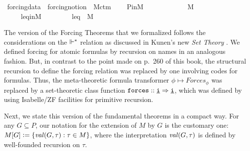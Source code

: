 \begin{isabelle}
\isamarkupfalse%
\ forcing{\isacharunderscore}{\kern0pt}data{}\ {\isacharequal}{\kern0pt}\ forcing{\isacharunderscore}{\kern0pt}notion\ {\isacharplus}{\kern0pt}\ M{\isacharunderscore}{\kern0pt}ctm{}\ {\isacharplus}{\kern0pt}\isanewline
\ \ \ P{\isacharunderscore}{\kern0pt}in{\isacharunderscore}{\kern0pt}M{\isacharcolon}{\kern0pt}\ \ \ \ \ \ \ \ \ \ \ {\isachardoublequoteopen}{\isasymbbbP}\ {\isasymin}\ M{\isachardoublequoteclose}\isanewline
\ \ \ \ \ leq{\isacharunderscore}{\kern0pt}in{\isacharunderscore}{\kern0pt}M{\isacharcolon}{\kern0pt}\ \ \ \ \ \ \ \ \ {\isachardoublequoteopen}leq\ {\isasymin}\ M{\isachardoublequoteclose}
\end{isabelle}
The version of the Forcing Theorems that we formalized follows the
considerations on the $\Vdash^*$ relation as discussed in Kunen's new
\emph{Set Theory}
\cite[p.~257ff]{kunen2011set}.
We defined forcing for atomic formulas by recursion on names in an
analogous fashion. But, in contrast to the point made on
p.~260 of this book, the structural recursion to define the forcing
relation was replaced by one  involving codes for formulas. Thus, the meta-theoretic formula
transformer $\phi\mapsto\mathit{Forces}_\phi$ was replaced by a
set-theoretic class function $\forceisa:: \tyi \fun \tyi$, which was defined by using
Isabelle/ZF facilities for primitive recursion.

Next, we state this version of the fundamental theorems in a compact
way. For any $G\subseteq P$, our notation for the extension of $M$ by
$G$ is the  customary one: $M[G]\mathrel{\mathop:}=
\{ \operatorname{\mathit{val}}(G,\tau) : \tau\in M \}$, where the interpretation
$\operatorname{\mathit{val}}(G,\tau)$ is defined by well-founded recursion on
$\tau$.

